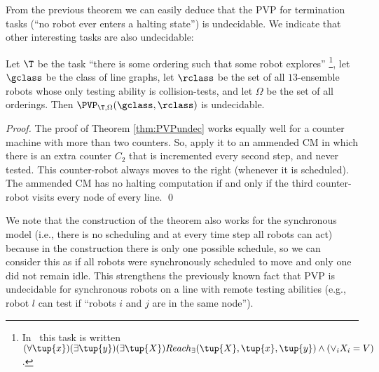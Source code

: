
From the previous theorem we can easily deduce that the PVP for termination tasks (``no robot ever enters a halting state'') is undecidable. We indicate that other interesting tasks are also undecidable:

\begin{corollary}
Let $\T$ be the task ``there is some ordering such that some robot explores'' \footnote{In \MRTL\ this task is written $(\forall \tup{x}) (\exists \tup{y}) (\exists \tup{X}) Reach_{\exists}(\tup{X},\tup{x},\tup{y}) \wedge (\vee_i X_i = V)$.}, let $\gclass$ be the class of line graphs, let $\rclass$ be the set of all $13$-ensemble robots whose only testing ability is collision-tests, and let $\Omega$ be the set of all orderings. Then $\PVP_{\T,\Omega}(\gclass,\rclass)$ is undecidable.
\end{corollary}

\begin{proof}
The proof of Theorem \ref{thm:PVPundec} works equally well for a counter machine with more than two counters. So, apply it to an ammended CM in which there is an extra counter $C_2$ that is incremented every second step, and never tested. This counter-robot always moves to the right (whenever it is scheduled). The ammended CM has no halting computation if and only if the third counter-robot visits every node of every line. \qed
\end{proof}

We note that the construction of the theorem also works for the synchronous model (i.e., there is no scheduling and at every time step all robots can act) because in the construction there is only one possible schedule, so we can consider this as if all robots were synchronously scheduled to move and only one did not remain idle. This strengthens the previously known fact that PVP is undecidable for synchronous robots on a line with remote testing abilities (e.g., robot $l$ can test if ``robots $i$ and $j$ are in the same node'').

